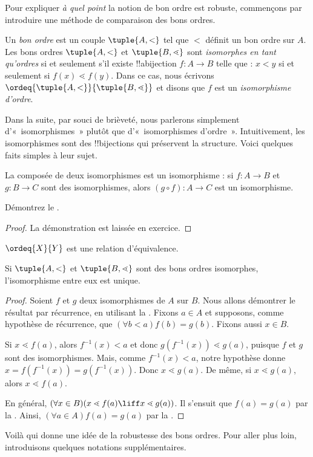 \documentclass[../../../include/open-logic-section]{subfiles}
\begin{document}

Pour expliquer \emph{à quel point} la notion de bon ordre est robuste,
commençons par introduire une méthode de comparaison des bons ordres.

\begin{defn}
Un \emph{bon ordre} est un couple $\tuple{A, <}$ tel que $<$ définit
un bon ordre sur $A$. Les bons ordres $\tuple{A, <}$ et $\tuple{B,
\lessdot}$ sont \emph{isomorphes en tant qu'ordres} si et seulement
s'il existe !!a{bijection} $f \colon A \to B$ telle que : $x < y$ si
et seulement si $f(x) \lessdot f(y)$. Dans ce cas, nous écrivons
$\ordeq{\tuple{A, <}}{\tuple{B, \lessdot}}$ et disons que $f$ est un
\emph{isomorphisme d'ordre}.
\end{defn}
\noindent
Dans la suite, par souci de brièveté, nous parlerons simplement
d'«~isomorphismes~» plutôt que d'«~isomorphismes d'ordre~».
Intuitivement, les isomorphismes sont des !!{bijection}s qui préservent
la structure. Voici quelques faits simples à leur sujet.

\begin{lem}
La composée de deux isomorphismes est un isomorphisme : si $f \colon A
\to B$ et $g \colon B \to C$ sont des isomorphismes, alors
$(g \circ f) \colon A \to C$ est un isomorphisme.
\end{lem}
\begin{prob}
	Démontrez le .
\end{prob}
\begin{proof}
La démonstration est laissée en exercice.
\end{proof}
\begin{cor}
	$\ordeq{X}{Y}$ est une relation d'équivalence.
\end{cor}
\begin{prop}
Si $\tuple{A, <}$ et $\tuple{B, \lessdot}$ sont des bons ordres
isomorphes, l'isomorphisme entre eux est unique.
\end{prop}

\begin{proof}
Soient $f$ et $g$ deux isomorphismes de $A$ sur $B$. Nous allons
démontrer le résultat par récurrence, en utilisant
la .
Fixons $a\in A$ et supposons, comme hypothèse de récurrence, que
$(\forall b < a)f(b) = g(b)$. Fixons aussi $x \in B$.

Si $x \lessdot f(a)$, alors $f^{-1}(x) < a$ et donc
$g(f^{-1}(x)) \lessdot g(a)$, puisque $f$ et $g$ sont des
isomorphismes. Mais, comme $f^{-1}(x) < a$, notre hypothèse donne
$x =f(f^{-1}(x)) = g(f^{-1}(x))$. Donc $x \lessdot g(a)$. De même, si
$x \lessdot g(a)$, alors $x \lessdot f(a)$.

En général, $(\forall x \in B)(x \lessdot f(a) \liff x \lessdot
g(a))$. Il s'ensuit que $f(a) = g(a)$ par la
. Ainsi,
$(\forall a \in A)f(a) = g(a)$ par la .
\end{proof}\noindent
Voilà qui donne une idée de la robustesse des bons ordres. Pour aller
plus loin, introduisons quelques notations supplémentaires.
\end{document}
